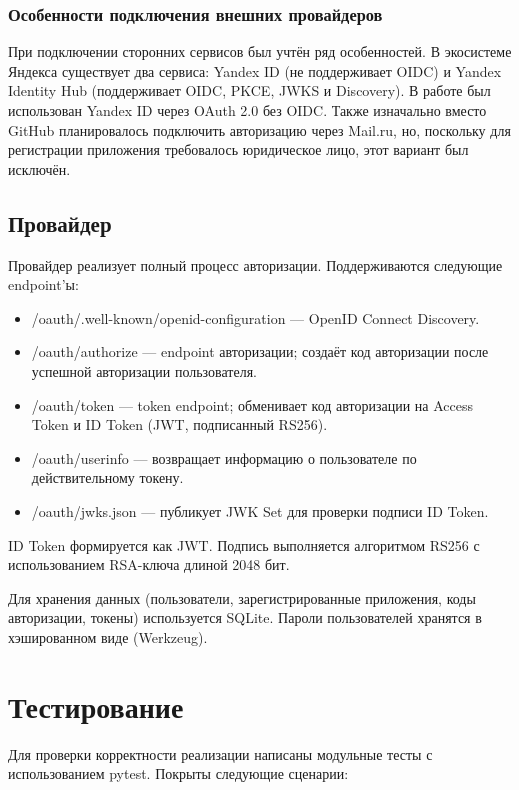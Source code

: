 \documentclass[a4paper]{article}
\begin{document}
\subsubsection{Особенности подключения внешних провайдеров}

При подключении сторонних сервисов был учтён ряд особенностей. В экосистеме Яндекса существует два сервиса: Yandex ID (не поддерживает OIDC) и Yandex Identity Hub (поддерживает OIDC, PKCE, JWKS и Discovery). В работе был использован Yandex ID через OAuth 2.0 без OIDC. Также изначально вместо GitHub планировалось подключить авторизацию через Mail.ru, но, поскольку для регистрации приложения требовалось юридическое лицо, этот вариант был исключён.

\subsection{Провайдер}

Провайдер реализует полный процесс авторизации. Поддерживаются следующие endpoint'ы:
\begin{itemize}
    \item /oauth/.well-known/openid-configuration --- OpenID Connect Discovery.
    \item /oauth/authorize --- endpoint авторизации; создаёт код авторизации после успешной авторизации пользователя.
    \item /oauth/token --- token endpoint; обменивает код авторизации на Access Token и ID Token (JWT, подписанный RS256).
    \item /oauth/userinfo --- возвращает информацию о пользователе по действительному токену.
    \item /oauth/jwks.json --- публикует JWK Set для проверки подписи ID Token.
\end{itemize}

ID Token формируется как JWT. Подпись выполняется алгоритмом RS256 с использованием RSA-ключа длиной 2048 бит.

Для хранения данных (пользователи, зарегистрированные приложения, коды авторизации, токены) используется SQLite. Пароли пользователей хранятся в хэшированном виде (Werkzeug).

\section{Тестирование}

Для проверки корректности реализации написаны модульные тесты с использованием pytest. Покрыты следующие сценарии:
\end{document}
